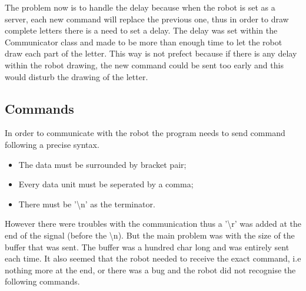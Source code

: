 The problem now is to handle the delay because when the robot is set as a server, each new command will replace the previous one, thus in order to draw complete letters there is a need to set a delay. The delay was set within the Communicator class and made to be more than enough time to let the robot draw each part of the letter. This way is not prefect because if there is any delay within the robot drawing, the new command could be sent too early and this would disturb the drawing of the letter.

\subsection{Commands}

In order to communicate with the robot the program needs to send command following a precise syntax.
\begin{itemize}
  \item The data must be surrounded by bracket pair;
  \item Every data unit must be seperated by a comma;
  \item There must be '\textbackslash n' as the terminator.
\end{itemize}

However there were troubles with the communication thus a '\textbackslash r' was added at the end of the signal (before the \textbackslash n). But the main problem was with the size of the buffer that was sent. The buffer was a hundred char long and was entirely sent each time. It also seemed that the robot needed to receive the exact command, i.e nothing more at the end, or there was a bug and the robot did not recognise the following commands.
